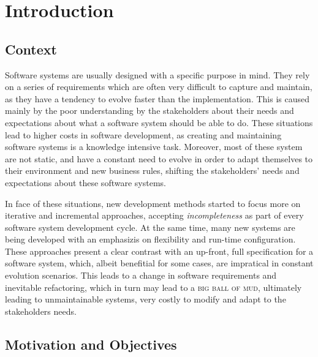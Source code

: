 \chapter{Introduction}\label{chap:intro}

\section{Context}\label{sec:context}

Software systems are usually designed with a specific purpose in mind\cite{}. They rely on a series of requirements which are often very difficult to capture and maintain, as they have a tendency to evolve faster than the implementation. This is caused mainly by the poor understanding by the stakeholders about their needs and expectations about what a software system should be able to do\cite{PT07}. These situations lead to higher costs in software development, as creating and maintaining software systems is a knowledge intensive task\cite{AdOdSBD07}. Moreover, most of these system are not static, and have a constant need to evolve in order to adapt themselves to their environment and new business rules, shifting the stakeholders' needs and expectations about these software systems.

In face of these situations, new development methods started to focus more on iterative and incremental approaches, accepting \textit{incompleteness} as part of every software system development cycle\cite{WC03}. At the same time, many new systems are being developed with an emphasizis on flexibility and run-time configuration\cite{YJ02}. These approaches present a clear contrast with an up-front, full specification for a software system, which, albeit benefitial for some cases, are impratical in constant evolution scenarios. This leads to a change in software requirements and inevitable refactoring, which in turn may lead to a \textsc{big ball of mud}, ultimately leading to unmaintainable systems, very costly to modify and adapt to the stakeholders needs\cite{FY97}.


\section{Motivation and Objectives}\label{sec:goals}


